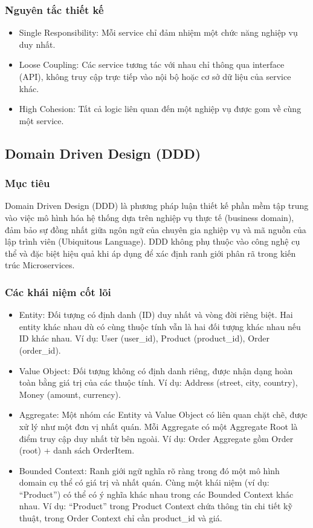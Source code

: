 \documentclass[12pt,a4paper]{article}
\begin{document}
\subsubsection{Nguyên tắc thiết kế}
\begin{itemize}
  \item Single Responsibility: Mỗi service chỉ đảm nhiệm một chức năng nghiệp vụ duy nhất.
  \item Loose Coupling: Các service tương tác với nhau chỉ thông qua interface (API), không truy cập trực tiếp vào nội bộ hoặc cơ sở dữ liệu của service khác.
  \item High Cohesion: Tất cả logic liên quan đến một nghiệp vụ được gom về cùng một service.
\end{itemize}

\subsection{Domain Driven Design (DDD)}
\subsubsection{Mục tiêu}
Domain Driven Design (DDD) là phương pháp luận thiết kế phần mềm tập trung vào việc mô
hình hóa hệ thống dựa trên nghiệp vụ thực tế (business domain), đảm bảo sự đồng nhất giữa
ngôn ngữ của chuyên gia nghiệp vụ và mã nguồn của lập trình viên (Ubiquitous Language).
DDD không phụ thuộc vào công nghệ cụ thể và đặc biệt hiệu quả khi áp dụng để xác định ranh
giới phân rã trong kiến trúc Microservices.

\subsubsection{Các khái niệm cốt lõi}
\begin{itemize}
  \item Entity: Đối tượng có định danh (ID) duy nhất và vòng đời riêng biệt. Hai entity khác nhau dù có cùng thuộc tính vẫn là hai đối tượng khác nhau nếu ID khác nhau. Ví dụ: User (user\_id), Product (product\_id), Order (order\_id).
  \item Value Object: Đối tượng không có định danh riêng, được nhận dạng hoàn toàn bằng giá trị của các thuộc tính. Ví dụ: Address (street, city, country), Money (amount, currency).
  \item Aggregate: Một nhóm các Entity và Value Object có liên quan chặt chẽ, được xử lý như một đơn vị nhất quán. Mỗi Aggregate có một Aggregate Root là điểm truy cập duy nhất từ bên ngoài. Ví dụ: Order Aggregate gồm Order (root) + danh sách OrderItem.
  \item Bounded Context: Ranh giới ngữ nghĩa rõ ràng trong đó một mô hình domain cụ thể có giá trị và nhất quán. Cùng một khái niệm (ví dụ: ``Product'') có thể có ý nghĩa khác nhau trong các Bounded Context khác nhau. Ví dụ: ``Product'' trong Product Context chứa thông tin chi tiết kỹ thuật, trong Order Context chỉ cần product\_id và giá.
\end{itemize}
\end{document}

